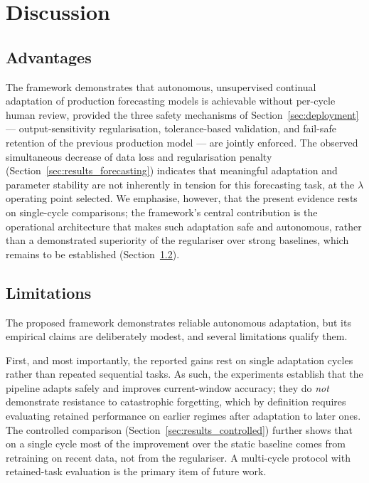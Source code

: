 \documentclass[journal]{IEEEtran}
\begin{document}
\section{Discussion}
\label{sec:discussion}

\subsection{Advantages}

The framework demonstrates that autonomous, unsupervised continual
adaptation of production forecasting models is achievable without
per-cycle human review, provided the three safety mechanisms of
Section~\ref{sec:deployment} --- output-sensitivity regularisation,
tolerance-based validation, and fail-safe retention of the previous
production model --- are jointly enforced. The observed simultaneous
decrease of data loss and regularisation penalty
(Section~\ref{sec:results_forecasting}) indicates that meaningful
adaptation and parameter stability are not inherently in tension for
this forecasting task, at the $\lambda$ operating point selected. We
emphasise, however, that the present evidence rests on single-cycle
comparisons; the framework's central contribution is the operational
architecture that makes such adaptation safe and autonomous, rather than
a demonstrated superiority of the regulariser over strong baselines,
which remains to be established (Section~\ref{sec:limitations_fisher}).

\subsection{Limitations}
\label{sec:limitations_fisher}

The proposed framework demonstrates reliable autonomous adaptation, but
its empirical claims are deliberately modest, and several limitations
qualify them.

First, and most importantly, the reported gains rest on single
adaptation cycles rather than repeated sequential tasks. As such, the
experiments establish that the pipeline adapts safely and improves
current-window accuracy; they do \emph{not} demonstrate resistance to
catastrophic forgetting, which by definition requires evaluating
retained performance on earlier regimes after adaptation to later ones.
The controlled comparison (Section~\ref{sec:results_controlled}) further
shows that on a single cycle most of the improvement over the static
baseline comes from retraining on recent data, not from the regulariser.
A multi-cycle protocol with retained-task evaluation is the primary item
of future work.
\end{document}
